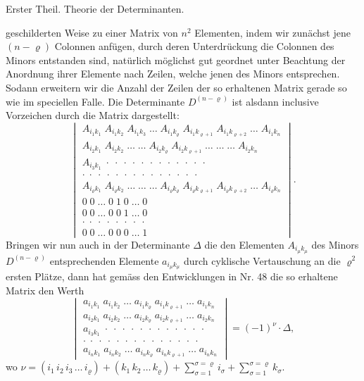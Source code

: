 \documentclass[11pt]{article}
\providecommand{\weberpage}[1]{}
\let\Delta\varDelta
\begin{document}
\weberpage{92}
Erster Theil. Theorie der Determinanten.

geschilderten Weise zu einer Matrix von $n^2$ Elementen, indem wir zunächst jene $(n-\varrho)$ Colonnen anfügen, durch deren Unterdrückung die Colonnen des Minors entstanden sind, natürlich möglichst gut geordnet unter Beachtung der Anordnung ihrer Elemente nach Zeilen, welche jenen des Minors entsprechen. Sodann erweitern wir die Anzahl der Zeilen der so erhaltenen Matrix gerade so wie im speciellen Falle. Die Determinante $D^{(n-\varrho)}$ ist alsdann inclusive Vorzeichen durch die Matrix dargestellt:
\[
\begin{vmatrix}
A_{i_1k_1}\;A_{i_1k_2}\;A_{i_1k_3}\;\ldots\;A_{i_1k_\varrho}\;A_{i_1k_{\varrho+1}}\;A_{i_1k_{\varrho+2}}\;\ldots\;A_{i_1k_n} \\
A_{i_2k_1}\;A_{i_2k_2}\;\ldots\;\ldots\;A_{i_2k_\varrho}\;A_{i_2k_{\varrho+1}}\;\ldots\;\ldots\;\ldots\;A_{i_2k_n} \\
A_{i_3k_1}\;\cdot\;\cdot\;\cdot\;\cdot\;\cdot\;\cdot\;\cdot\;\cdot\;\cdot\;\cdot\;\cdot\;\cdot \\
\cdot\;\cdot\;\cdot\;\cdot\;\cdot\;\cdot\;\cdot\;\cdot\;\cdot\;\cdot\;\cdot\;\cdot\;\cdot\;\cdot \\
A_{i_\varrho k_1}\;A_{i_\varrho k_2}\;\ldots\;\ldots\;\ldots\;A_{i_\varrho k_\varrho}\;A_{i_\varrho k_{\varrho+1}}\;A_{i_\varrho k_{\varrho+2}}\;\ldots\;A_{i_\varrho k_n} \\
0\;0\;\ldots\;0\;1\;0\;\ldots\;0 \\
0\;0\;\ldots\;0\;0\;1\;\ldots\;0 \\
\cdot\;\cdot\;\cdot\;\cdot\;\cdot\;\cdot\;\cdot\;\cdot \\
0\;0\;\ldots\;0\;0\;0\;\ldots\;1
\end{vmatrix}.
\]
Bringen wir nun auch in der Determinante $\Delta$ die den Elementen $A_{i_\mu k_\mu}$ des Minors $D^{(n-\varrho)}$ entsprechenden Elemente $a_{i_\mu k_\mu}$ durch cyklische Vertauschung an die $\varrho^2$ ersten Plätze, dann hat gemäss den Entwicklungen in Nr. 48 die so erhaltene Matrix den Werth
\[
\begin{vmatrix}
a_{i_1k_1}\;a_{i_1k_2}\;\ldots\;a_{i_1k_\varrho}\;a_{i_1k_{\varrho+1}}\;\ldots\;a_{i_1k_n} \\
a_{i_2k_1}\;a_{i_2k_2}\;\ldots\;a_{i_2k_\varrho}\;a_{i_2k_{\varrho+1}}\;\ldots\;a_{i_2k_n} \\
a_{i_3k_1}\;\cdot\;\cdot\;\cdot\;\cdot\;\cdot\;\cdot\;\cdot\;\cdot\;\cdot\;\cdot\;\cdot\;\cdot \\
\cdot\;\cdot\;\cdot\;\cdot\;\cdot\;\cdot\;\cdot\;\cdot\;\cdot\;\cdot\;\cdot\;\cdot\;\cdot\;\cdot \\
a_{i_nk_1}\;a_{i_nk_2}\;\ldots\;a_{i_nk_\varrho}\;a_{i_nk_{\varrho+1}}\;\ldots\;a_{i_nk_n}
\end{vmatrix}
=(-1)^\nu\cdot\Delta,
\]
wo $\nu=(i_1\,i_2\,i_3\,\ldots\,i_\varrho)+(k_1\,k_2\,\ldots\,k_\varrho)+\displaystyle\sum_{\sigma=1}^{\sigma=\varrho}i_\sigma+\sum_{\sigma=1}^{\sigma=\varrho}k_\sigma.$
\end{document}

